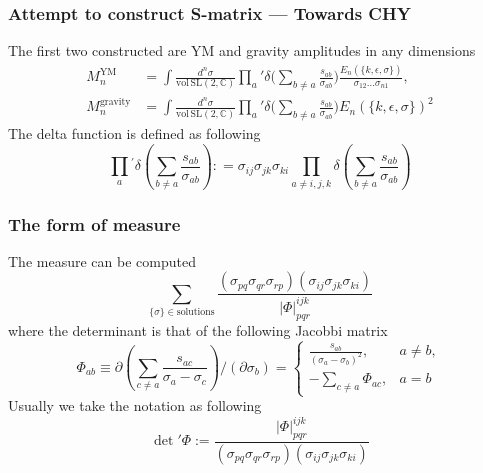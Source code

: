 \documentclass{beamer}
\begin{document}
\begin{frame}
    \frametitle{Attempt to construct S-matrix --- Towards CHY}
    The first two constructed are YM and gravity amplitudes in any dimensions
    \begin{align*}
        M_n^{\mathrm{YM}}&=\int\frac{d^n\sigma}{\mathrm{vol\,SL}(2,\mathbb{C})}\prod_a{'}\delta\bigg(\sum_{b\neq a}\frac{s_{ab}}{\sigma_{ab}}\bigg)\frac{E_n(\{k,\epsilon,\sigma\})}{\sigma_{12}\dots\sigma_{n1}},\\
        M_n^{\mathrm{gravity}}&=\int\frac{d^n\sigma}{\mathrm{vol\,SL}(2,\mathbb{C})}\prod_a{'}\delta\bigg(\sum_{b\neq a}\frac{s_{ab}}{\sigma_{ab}}\bigg)E_n(\{k,\epsilon,\sigma\})^2
    \end{align*}
    \pause
    The delta function is defined as following
    \begin{equation*}
        \prod_{a}{}^{\prime}\delta{\left(\sum_{b\neq a}\frac{s_{ab}}{\sigma_{ab}}\right)}{:}=\sigma_{ij}\sigma_{jk}\sigma_{ki}\prod_{a\neq i,j,k}\delta{\left(\sum_{b\neq a}\frac{s_{ab}}{\sigma_{ab}}\right)}
    \end{equation*}
\end{frame}
\begin{frame}
    \frametitle{The form of measure}
    The measure can be computed %
    \begin{equation*}
            \boxed{
            \sum_{\{\sigma\}\in\mathrm{solutions}}\frac{(\sigma_{pq}\sigma_{qr}\sigma_{rp})(\sigma_{ij}\sigma_{jk}\sigma_{ki})}{|\Phi|_{pqr}^{ijk}}}
    \end{equation*}
    where the determinant is that of the following Jacobbi matrix
    \begin{equation*}
        \Phi_{ab}\equiv\partial\left(\sum_{c\neq a}\frac{s_{ac}}{\sigma_a-\sigma_c}\right)/\left(\partial\sigma_b\right)=\begin{cases}\frac{s_{ab}}{(\sigma_a-\sigma_b)^2},&a\neq b,\\-\sum_{c\neq a}\Phi_{ac}, &a=b\end{cases}
    \end{equation*}
    \pause
    Usually we take the notation as following
    \begin{equation*}
        \boxed{
        \det{'}\Phi:=\frac{|\Phi|_{pqr}^{ijk}}{(\sigma_{pq}\sigma_{qr}\sigma_{rp})(\sigma_{ij}\sigma_{jk}\sigma_{ki})}}
    \end{equation*}
\end{frame}
\end{document}
